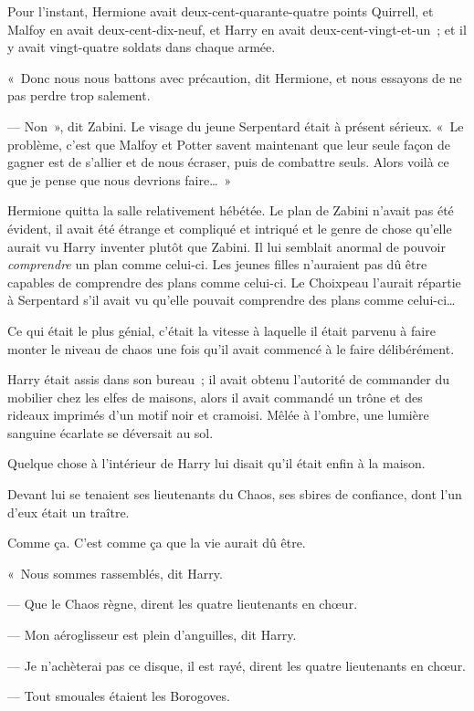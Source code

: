 Pour l'instant, Hermione avait deux-cent-quarante-quatre points Quirrell, et Malfoy en avait deux-cent-dix-neuf, et Harry en avait deux-cent-vingt-et-un~; et il y avait vingt-quatre soldats dans chaque armée.

«~Donc nous nous battons avec précaution, dit Hermione, et nous essayons de ne pas perdre trop salement.

--- Non~», dit Zabini.
Le visage du jeune Serpentard était à présent sérieux.
«~Le problème, c'est que Malfoy et Potter savent maintenant que leur seule façon de gagner est de s'allier et de nous écraser, puis de combattre seuls.
Alors voilà ce que je pense que nous devrions faire…~»

Hermione quitta la salle relativement hébétée.
Le plan de Zabini n'avait pas été évident, il avait été étrange et compliqué et intriqué et le genre de chose qu'elle aurait vu Harry inventer plutôt que Zabini.
Il lui semblait anormal de pouvoir \emph{comprendre} un plan comme celui-ci.
Les jeunes filles n'auraient pas dû être capables de comprendre des plans comme celui-ci.
Le Choixpeau l'aurait répartie à Serpentard s'il avait vu qu'elle pouvait comprendre des plans comme celui-ci…

\later

Ce qui était le plus génial, c'était la vitesse à laquelle il était parvenu à faire monter le niveau de chaos une fois qu'il avait commencé à le faire délibérément.

Harry était assis dans son bureau~; il avait obtenu l'autorité de commander du mobilier chez les elfes de maisons, alors il avait commandé un trône et des rideaux imprimés d'un motif noir et cramoisi.
Mêlée à l'ombre, une lumière sanguine écarlate se déversait au sol.

Quelque chose à l'intérieur de Harry lui disait qu'il était enfin à la maison.

Devant lui se tenaient ses lieutenants du Chaos, ses sbires de confiance, dont l'un d'eux était un traître.

Comme ça.
C'est comme ça que la vie aurait dû être.

«~Nous sommes rassemblés, dit Harry.

--- Que le Chaos règne, dirent les quatre lieutenants en chœur.

--- Mon aéroglisseur est plein d'anguilles, dit Harry.

--- Je n'achèterai pas ce disque, il est rayé, dirent les quatre lieutenants en chœur.

--- Tout smouales étaient les Borogoves.

